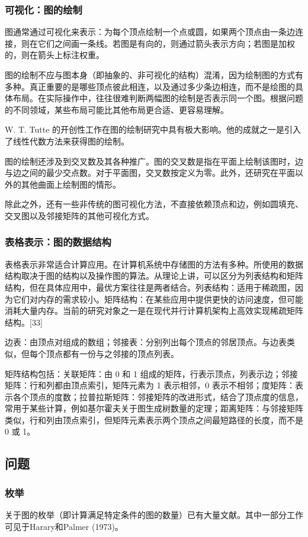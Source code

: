 \subsubsection{可视化：图的绘制}
图通常通过可视化来表示：为每个顶点绘制一个点或圆，如果两个顶点由一条边连接，则在它们之间画一条线。若图是有向的，则通过箭头表示方向；若图是加权的，则在箭头上标注权重。

图的绘制不应与图本身（即抽象的、非可视化的结构）混淆，因为绘制图的方式有多种。真正重要的是哪些顶点彼此相连，以及通过多少条边相连，而不是绘图的具体布局。在实际操作中，往往很难判断两幅图的绘制是否表示同一个图。根据问题的不同领域，某些布局可能比其他布局更合适、更容易理解。

W. T. Tutte 的开创性工作在图的绘制研究中具有极大影响。他的成就之一是引入了线性代数方法来获得图的绘制。

图的绘制还涉及到交叉数及其各种推广。图的交叉数是指在平面上绘制该图时，边与边之间的最少交点数。对于平面图，交叉数按定义为零。此外，还研究在平面以外的其他曲面上绘制图的情形。

除此之外，还有一些非传统的图可视化方法，不直接依赖顶点和边，例如圆填充、交叉图以及邻接矩阵的其他可视化方式。
\subsubsection{表格表示：图的数据结构}
表格表示非常适合计算应用。在计算机系统中存储图的方法有多种。所使用的数据结构取决于图的结构以及操作图的算法。从理论上讲，可以区分为列表结构和矩阵结构，但在具体应用中，最优方案往往是两者结合。列表结构：适用于稀疏图，因为它们对内存的需求较小。矩阵结构：在某些应用中提供更快的访问速度，但可能消耗大量内存。当前的研究对象之一是在现代并行计算机架构上高效实现稀疏矩阵结构。[33]

边表：由顶点对组成的数组；邻接表：分别列出每个顶点的邻居顶点。与边表类似，但每个顶点都有一份与之邻接的顶点列表。

矩阵结构包括：关联矩阵：由 0 和 1 组成的矩阵，行表示顶点，列表示边；邻接矩阵：行和列都由顶点索引，矩阵元素为 1 表示相邻，0 表示不相邻；度矩阵：表示各个顶点的度数；拉普拉斯矩阵：邻接矩阵的改进形式，结合了顶点度的信息，常用于某些计算，例如基尔霍夫关于图生成树数量的定理；距离矩阵：与邻接矩阵类似，行和列由顶点索引，但矩阵元素表示两个顶点之间最短路径的长度，而不是 0 或 1。
\subsection{问题}
\subsubsection{枚举}
关于图的枚举（即计算满足特定条件的图的数量）已有大量文献。其中一部分工作可见于Harary和Palmer (1973)。
